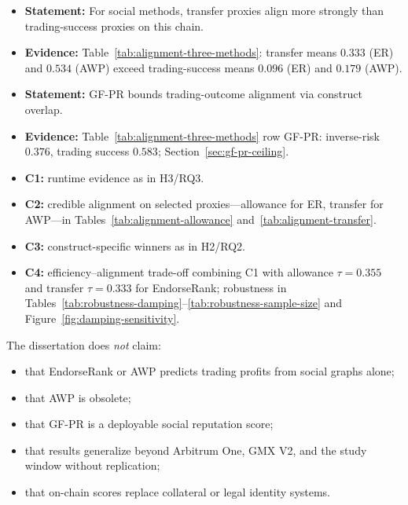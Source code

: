 
\begin{itemize}
\item \textbf{Statement:} For social methods, transfer proxies align more strongly than trading-success proxies on this chain.

\item \textbf{Evidence:} Table~\ref{tab:alignment-three-methods}: transfer means $0.333$ (ER) and $0.534$ (AWP) exceed trading-success means $0.096$ (ER) and $0.179$ (AWP).
\end{itemize}


\begin{itemize}
\item \textbf{Statement:} GF-PR bounds trading-outcome alignment via construct overlap.

\item \textbf{Evidence:} Table~\ref{tab:alignment-three-methods} row GF-PR: inverse-risk $0.376$, trading success $0.583$; Section~\ref{sec:gf-pr-ceiling}.
\end{itemize}


\begin{itemize}
\item \textbf{C1:} runtime evidence as in H3/RQ3.
\item \textbf{C2:} credible alignment on selected proxies---allowance for ER, transfer for AWP---in Tables~\ref{tab:alignment-allowance} and~\ref{tab:alignment-transfer}.
\item \textbf{C3:} construct-specific winners as in H2/RQ2.
\item \textbf{C4:} efficiency--alignment trade-off combining C1 with allowance $\tau=0.355$ and transfer $\tau=0.333$ for EndorseRank; robustness in Tables~\ref{tab:robustness-damping}--\ref{tab:robustness-sample-size} and Figure~\ref{fig:damping-sensitivity}.
\end{itemize}


The dissertation does \emph{not} claim:

\begin{itemize}
\item that EndorseRank or AWP predicts trading profits from social graphs alone;
\item that AWP is obsolete;
\item that GF-PR is a deployable social reputation score;
\item that results generalize beyond Arbitrum One, GMX V2, and the study window without replication;
\item that on-chain scores replace collateral or legal identity systems.
\end{itemize}

